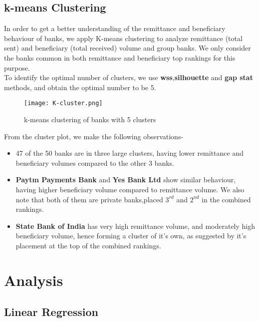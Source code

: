 \documentclass{article}
\begin{document}
\subsection{k-means Clustering}

In order to get a better understanding of the remittance and beneficiary behaviour of banks, we apply K-means clustering to analyze remittance (total sent) and beneficiary (total received) volume and group banks. We only consider the banks common in both remittance and beneficiary top rankings for this purpose.\\

To identify the optimal number of clusters, we use \textbf{wss},\textbf{silhouette} and \textbf{gap stat} methods, and obtain the optimal number to be 5.\\

\begin{figure}[H]
    \centering
    \texttt{[image: K-cluster.png]}
    \caption{k-means clustering of banks with 5 clusters}
    \label{fig:example}
\end{figure}


From the cluster plot, we make the following observations-
\begin{itemize}
    \item 47 of the 50 banks are in three large clusters, having lower remittance and beneficiary volumes compared to the other 3 banks.
    \item \textbf{Paytm Payments Bank} and \textbf{Yes Bank Ltd} show similar behaviour, having higher beneficiary volume compared to remittance volume. We also note that both of them are private banks,placed $3^{rd}$ and $2^{nd}$ in the combined rankings.
    \item \textbf{State Bank of India} has very high remittance volume, and moderately high beneficiary volume, hence forming a cluster of it's own, as suggested by it's placement at the top of the combined rankings.
\end{itemize}





\section{Analysis}

\subsection{Linear Regression}
\end{document}
